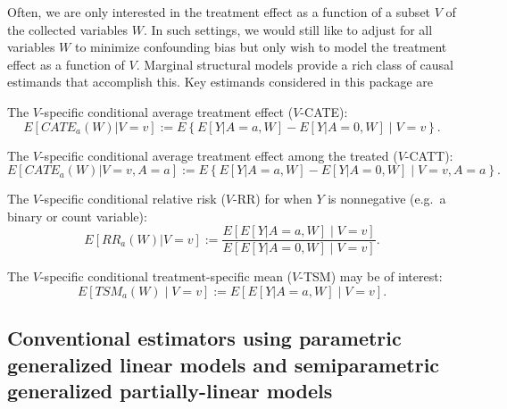 \documentclass[
]{jss}
\begin{document}
Often, we are only interested in the treatment effect as a function of a
subset \(V\) of the collected variables \(W\). In such settings, we
would still like to adjust for all variables \(W\) to minimize
confounding bias but only wish to model the treatment effect as a
function of \(V\). Marginal structural models provide a rich class of
causal estimands that accomplish this. Key estimands considered in this
package are

\noindent The \(V\)-specific conditional average treatment effect
(\(V\)-CATE): \begin{equation}
E[CATE_{a}(W)|V=v] := E\left\{ E[Y|A=a,W] - E[Y|A=0, W] \mid V =v\right\}.
\end{equation}

\vspace{0.5cm}

\noindent The \(V\)-specific conditional average treatment effect among
the treated (\(V\)-CATT): \begin{equation}
E[CATE_{a}(W)|V=v, A=a] := E\left\{ E[Y|A=a,W] - E[Y|A=0, W] \mid V =v, A =a\right\}.
\end{equation} \vspace{0.5cm}

\noindent The \(V\)-specific conditional relative risk (\(V\)-RR) for
when \(Y\) is nonnegative (e.g.~a binary or count variable):
\begin{equation}
E[RR_a(W)|V=v] := \frac{E[E[Y|A=a,W] \mid V=v]}{E[E[Y|A=0,W] \mid V=v]}.
\end{equation}

\vspace{0.5cm}

\noindent The \(V\)-specific conditional treatment-specific mean
(\(V\)-TSM) may be of interest: \begin{equation}
E[TSM_a(W) \mid V =v ] := E[E[Y|A=a,W] \mid V = v].
\end{equation}

\subsection{Conventional estimators using parametric generalized linear models and semiparametric generalized partially-linear models}
\end{document}
